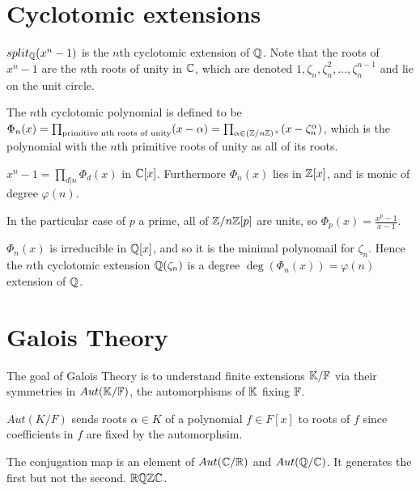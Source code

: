 \documentclass[11pt]{article}
\begin{document}
\section*{Cyclotomic extensions}
\begin{definition}
  $split_{\mathbb{Q}}(x^n - 1)$ is the $n$th cyclotomic extension of $\mathbb{Q}$. Note that the roots of $x^n - 1$ are the $n$th roots of unity in $\mathbb{C}$, which are denoted $1,\zeta_n, \zeta_n^2,...,\zeta_n^{n-1}$ and lie on the unit circle. 
\end{definition}
\begin{definition}
  The $n$th cyclotomic polynomial is defined to be $\Phi_n(x) = \prod_{\text{primitive nth roots of unity}}(x - \alpha) = \prod_{\alpha \in (\mathbb{Z}/n\mathbb{Z})^\times} (x - \zeta_n^\alpha)$, which is the polynomial with the $n$th primitive roots of unity as all of its roots.
\end{definition}
\begin{theorem}
  $x^n - 1 = \prod_{d | n} \Phi_d(x)$ in $\mathbb{C}[x]$. Furthermore $\Phi_n(x)$ lies in $\mathbb{Z}[x]$, and is monic of degree $\varphi(n)$.
\end{theorem}
\begin{example}
  In the particular case of $p$ a prime, all of $\mathbb{Z}/n\mathbb{Z}[p]$ are units, so $\Phi_p(x) = \frac{x^p - 1}{x - 1}$.
\end{example}

\begin{theorem}
  $\Phi_n(x)$ is irreducible in $\mathbb{Q}[x]$, and so it is the minimal polynomail for $\zeta_n$. Hence the $n$th cyclotomic extension $\mathbb{Q}(\zeta_n)$ is a degree $\deg(\Phi_n(x)) = \varphi(n)$ extension of $\mathbb{Q}$.
\end{theorem}



\section*{Galois Theory}
The goal of Galois Theory is to understand finite extensions $\mathbb{K}/\mathbb{F}$ via their symmetries in $Aut(\mathbb{K}/\mathbb{F})$, the automorphisms of $\mathbb{K}$ fixing $\mathbb{F}$.

\begin{remark}
  $Aut(K/F)$ sends roots $\alpha \in K$ of a polynomial $f \in F[x]$ to roots of $f$ since coefficients in $f$ are fixed by the automorphsim.
\end{remark}

\begin{example}
  The conjugation map is an element of $Aut(\mathbb{C}/\mathbb{R})$ and $Aut(\mathbb{Q}/\mathbb{C})$. It generates the first but not the second. $\mathbb{R} \mathbb{Q} \mathbb{Z} \mathbb{C}$.
\end{example}
\end{document}
